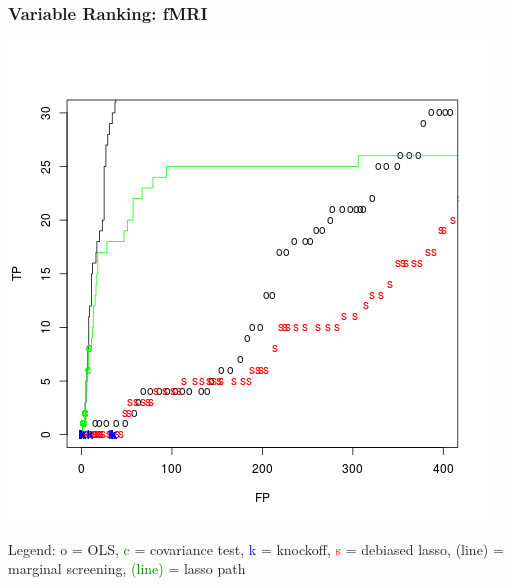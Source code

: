 \documentclass{beamer}
\begin{document}
\begin{frame}
\frametitle{Variable Ranking: fMRI}
\begin{center}
\includegraphics[scale = 0.35]{fMRI_tvf.png}
\end{center}

Legend: o = OLS, \textcolor{green}{c} = covariance test,
\textcolor{blue}{k} = knockoff, \textcolor{red}{s} = debiased lasso,
(line) = marginal screening, \textcolor{green}{(line)} = lasso path
\end{frame}
\end{document}
